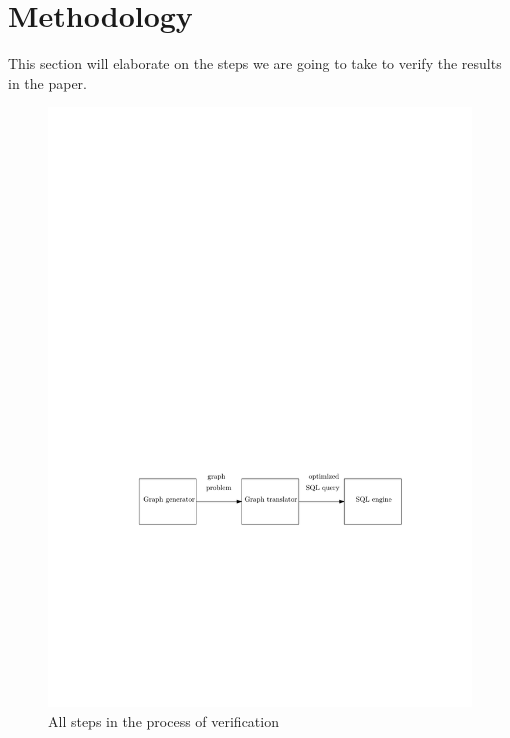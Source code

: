 \section{Methodology}
This section will elaborate on the steps we are going to take to verify the results in the paper.

\begin{figure}
	\includegraphics{figures/process.pdf}
	\caption{All steps in the process of verification}
	\label{fig:process}
\end{figure}